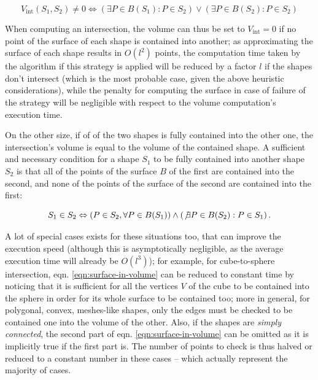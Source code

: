 \begin{equation} \label{eqn:no-surface-in-volume}
  V_{\text{int}}\left(S_1,S_2\right)\neq 0 \Leftrightarrow \left(\exists P \in
    B\left(S_1\right) : P \in S_2\right) \vee \left(\exists P \in
    B\left(S_2\right) : P \in S_2\right) 
\end{equation}

When computing an intersection, the volume can thus be set to $V_{\text{int}}=0$
if no point of the surface of each shape is contained into another; as
approximating the surface of each shape results in $O(l^2)$ points, the
computation time taken by the algorithm if this strategy is applied will be
reduced by a factor $l$ if the shapes don't intersect (which is the most
probable case, given the above heuristic considerations), while the penalty for
computing the surface in case of failure of the strategy will be negligible with
respect to the volume computation's execution time.

On the other size, if of of the two shapes is fully contained into the other
one, the intersection's volume is equal to the volume of the contained shape.
A sufficient and necessary condition for a shape $S_1$ to be fully contained into
another shape $S_2$ is that all of the points of the surface $B$ of the first
are contained into the second, and none of the points of the surface of the
second are contained into the first:

\begin{equation} \label{eqn:surface-in-volume}
  S_1 \in S_2 \Leftrightarrow \left( P \in S_2 , \forall P \in B(S_1) \right)
  \wedge \left( \not \exists P \in B(S_2) : P \in S_1 \right).
\end{equation}

A lot of special cases exists for these situations too, that can improve the
execution speed (although this is asymptotically negligible, as the average
execution time will already be $O(l^3)$); for example, for cube-to-sphere
intersection, eqn. \ref{eqn:surface-in-volume} can be reduced to constant time by
noticing that it is sufficient for all the vertices $V$ of the cube to be
contained into the sphere in order for its whole surface to be contained too;
more in general, for polygonal, convex, meshes-like shapes, only the edges must
be checked to be contained one into the volume of the other. Also, if the shapes
are \emph{simply connected}, the second part of eqn. \ref{eqn:surface-in-volume}
can be omitted as it is implicitly true if the first part is. The number of
points to check is thus halved or reduced to a constant number in these cases --
which actually represent the majority of cases.



